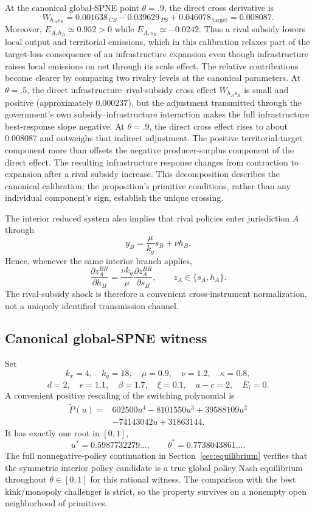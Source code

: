 At the canonical global-SPNE point $\theta=.9$, the direct cross derivative is
\[
W_{h_As_B}
=0.001638_{\,CS}
-0.039629_{\,PS}
+0.046078_{\,\text{target}}
=0.008087.
\]
Moreover, $E_{A,h_A}\simeq0.952>0$ while $E_{A,s_B}\simeq-0.0242$. Thus a rival subsidy lowers local output and territorial emissions, which in this calibration relaxes part of the target-loss consequence of an infrastructure expansion even though infrastructure raises local emissions on net through its scale effect. The relative contributions become clearer by comparing two rivalry levels at the canonical parameters. At $\theta=.5$, the direct infrastructure--rival-subsidy cross effect $W_{h_As_B}$ is small and positive (approximately $0.000237$), but the adjustment transmitted through the government's own subsidy--infrastructure interaction makes the full infrastructure best-response slope negative. At $\theta=.9$, the direct cross effect rises to about $0.008087$ and outweighs that indirect adjustment. The positive territorial-target component more than offsets the negative producer-surplus component of the direct effect. The resulting infrastructure response changes from contraction to expansion after a rival subsidy increase. This decomposition describes the canonical calibration; the proposition's primitive conditions, rather than any individual component's sign, establish the unique crossing.

The interior reduced system also implies that rival policies enter jurisdiction $A$ through
\[
y_B=\frac{\mu}{k_g}s_B+\nu h_B.
\]
Hence, whenever the same interior branch applies,
\begin{equation}
\frac{\partial z_A^{BR}}{\partial h_B}
=\frac{\nu k_g}{\mu}
\frac{\partial z_A^{BR}}{\partial s_B},
\qquad z_A\in\{s_A,h_A\}.
\label{eq:rival-policy-proportionality}
\end{equation}
The rival-subsidy shock is therefore a convenient cross-instrument normalization, not a uniquely identified transmission channel.

\subsection{Canonical global-SPNE witness}

Set
\[
k_x=4,\quad k_g=18,\quad \mu=0.9,\quad \nu=1.2,
\quad \kappa=0.8,
\]
\[
d=2,\quad e=1.1,\quad \beta=1.7,\quad \xi=0.1,
\quad a-c=2,\quad \bar E_i=0.
\]
A convenient positive rescaling of the switching polynomial is
\begin{align}
\widetilde P(u)=
&602500u^4-8101550u^3+39588109u^2\\
&-74143042u+31863144.
\label{eq:witness-P}
\end{align}
It has exactly one root in $[0,1]$,
\[
u^*=0.5987732279\ldots,
\qquad
\theta^*=0.7738043861\ldots.
\]
The full nonnegative-policy continuation in Section~\ref{sec:equilibrium} verifies that the symmetric interior policy candidate is a true global policy Nash equilibrium throughout $\theta\in[0,1]$ for this rational witness. The comparison with the best kink/monopoly challenger is strict, so the property survives on a nonempty open neighborhood of primitives.

